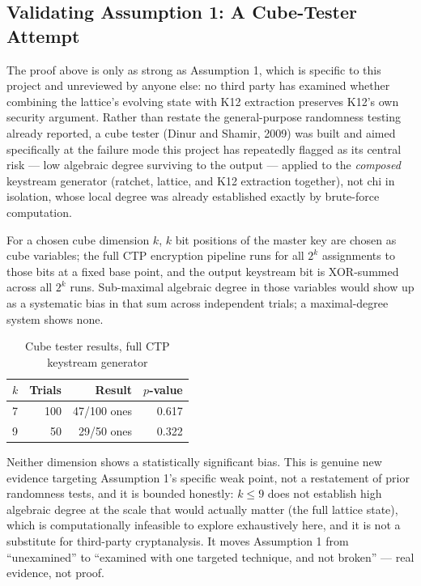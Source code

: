 \documentclass[twocolumn,10pt,journal,compsoc]{IEEEtran}
\begin{document}
\subsection{Validating Assumption 1: A Cube-Tester Attempt}
The proof above is only as strong as Assumption 1, which is specific to this project and unreviewed by anyone else: no third party has examined whether combining the lattice's evolving state with K12 extraction preserves K12's own security argument. Rather than restate the general-purpose randomness testing already reported, a cube tester (Dinur and Shamir, 2009) was built and aimed specifically at the failure mode this project has repeatedly flagged as its central risk --- low algebraic degree surviving to the output --- applied to the \emph{composed} keystream generator (ratchet, lattice, and K12 extraction together), not chi in isolation, whose local degree was already established exactly by brute-force computation.

For a chosen cube dimension $k$, $k$ bit positions of the master key are chosen as cube variables; the full CTP encryption pipeline runs for all $2^k$ assignments to those bits at a fixed base point, and the output keystream bit is XOR-summed across all $2^k$ runs. Sub-maximal algebraic degree in those variables would show up as a systematic bias in that sum across independent trials; a maximal-degree system shows none.

\begin{table}[h]
\centering
\caption{Cube tester results, full CTP keystream generator}
\label{tab:cubetest}
\begin{tabular}{@{}lrrr@{}}
\toprule
$k$ & Trials & Result & $p$-value \\
\midrule
7 & 100 & 47/100 ones & 0.617 \\
9 & 50  & 29/50 ones  & 0.322 \\
\bottomrule
\end{tabular}
\end{table}

Neither dimension shows a statistically significant bias. This is genuine new evidence targeting Assumption 1's specific weak point, not a restatement of prior randomness tests, and it is bounded honestly: $k \leq 9$ does not establish high algebraic degree at the scale that would actually matter (the full lattice state), which is computationally infeasible to explore exhaustively here, and it is not a substitute for third-party cryptanalysis. It moves Assumption 1 from ``unexamined'' to ``examined with one targeted technique, and not broken'' --- real evidence, not proof.
\end{document}
